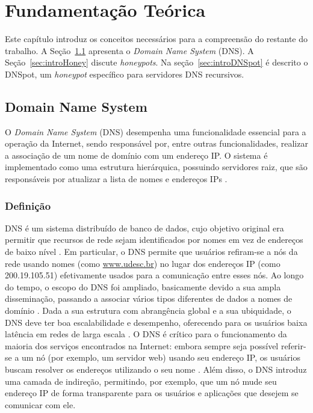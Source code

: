 \newcommand{\COMMENT}[1]{\noindent\fbox{\parbox{0.98\linewidth}{\bfseries #1}}}


\chapter{Fundamentação Teórica}
\label{ch:fundamentos}

Este capítulo introduz os conceitos necessários para a compreensão do restante do trabalho. A Seção~\ref{sec:introDNS} apresenta o \textit{Domain Name System} (DNS). A Seção~\ref{sec:introHoney} discute \textit{honeypots}. Na seção~\ref{sec:introDNSpot} é descrito o DNSpot, um \textit{honeypot} específico para servidores DNS recursivos.

\section{Domain Name System}
\label{sec:introDNS}

O \textit{Domain Name System} (DNS) desempenha uma funcionalidade essencial para a operação da Internet, sendo responsável por, entre outras funcionalidades, realizar a associação de um nome de domínio com um endereço IP. O sistema é implementado como uma estrutura hierárquica, possuindo servidores raiz, que são responsáveis por atualizar a lista de nomes e endereços IPs \cite{Gao:2013}.


\subsection{Definição}
\label{sec:defiDNS}

DNS é um sistema distribuído de banco de dados, cujo objetivo original
era permitir que recursos de rede sejam identificados por nomes em vez
de endereços de baixo nível \cite{rfc1034}. Em particular, o DNS
permite que usuários refiram-se a nós da rede usando nomes (como
\url{www.udesc.br}) no lugar dos endereços IP (como 200.19.105.51)
efetivamente usados para a comunicação entre esses nós. Ao longo do
tempo, o escopo do DNS foi ampliado, basicamente devido a sua ampla
disseminação, passando a associar vários tipos diferentes de dados a
nomes de domínio \cite{rfc3467}. Dada a sua estrutura com abrangência
global e a sua ubiquidade, o DNS deve ter boa escalabilidade e
desempenho, oferecendo para os usuários baixa latência em redes de
larga escala \cite{Jung:2002}. O DNS é crítico para o funcionamento da
maioria dos serviços encontrados na Internet: embora sempre seja
possível referir-se a um nó (por exemplo, um servidor web) usando seu
endereço IP, os usuários buscam resolver os endereços utilizando o seu
nome \cite{dnsmonitoring}. Além disso, o DNS introduz uma camada de
indireção, permitindo, por exemplo, que um nó mude seu endereço IP de
forma transparente para os usuários e aplicações que desejem se
comunicar com ele.


